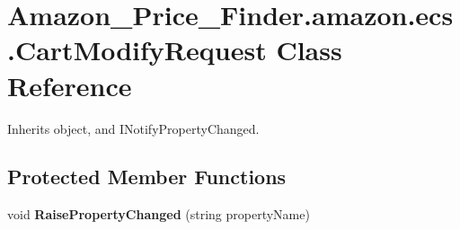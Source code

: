 \hypertarget{class_amazon___price___finder_1_1amazon_1_1ecs_1_1_cart_modify_request}{\section{Amazon\-\_\-\-Price\-\_\-\-Finder.\-amazon.\-ecs.\-Cart\-Modify\-Request Class Reference}
\label{class_amazon___price___finder_1_1amazon_1_1ecs_1_1_cart_modify_request}
}


 




Inherits object, and I\-Notify\-Property\-Changed.

\subsection*{Protected Member Functions}
\begin{DoxyCompactItemize}
\item 
\hypertarget{class_amazon___price___finder_1_1amazon_1_1ecs_1_1_cart_modify_request_a81fc2c803df93bd8b872735089d909fc}{void {\bfseries Raise\-Property\-Changed} (string property\-Name)}\label{class_amazon___price___finder_1_1amazon_1_1ecs_1_1_cart_modify_request_a81fc2c803df93bd8b872735089d909fc}

\end{DoxyCompactItemize}
